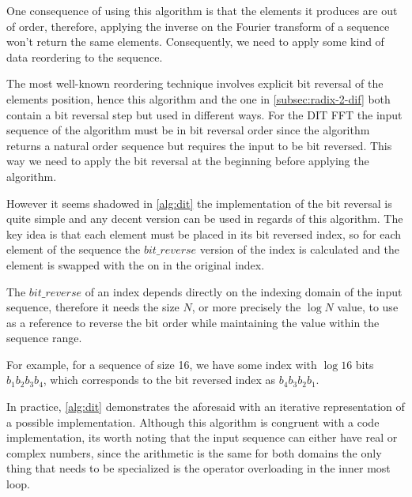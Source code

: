 \documentclass[
  oneside,
  11pt, a4paper,
  footinclude=true,
  headinclude=true,
  cleardoublepage=empty
]{scrbook}
\begin{document}
One consequence of using this algorithm is that the elements it produces are out of order, therefore, applying the inverse on the Fourier transform of a sequence won't return the same elements. Consequently, we need to apply some kind of data reordering to the sequence.

The most well-known reordering technique involves explicit bit reversal of the elements position, hence this algorithm and the one in \autoref{subsec:radix-2-dif} both contain a bit reversal step but used in different ways. For the DIT FFT  the input sequence of the algorithm must be in bit reversal order since the algorithm returns a natural order sequence but requires the input to be bit reversed. This way we need to apply the bit reversal at the beginning before applying the algorithm.

However it seems shadowed in \autoref{alg:dit} the implementation of the bit reversal is quite simple and any decent version can be used in regards of this algorithm. The key idea is that each element must be placed in its bit reversed index, so for each element of the sequence the $bit\_reverse$ version of the index is calculated and the element is swapped with the on in the original index.

The $bit\_reverse$ of an index depends directly on the indexing domain of the input sequence, therefore it needs the size $N$, or more precisely the $\log{N}$ value, to use as a reference to reverse the bit order while maintaining the value within the sequence range.

For example, for a sequence of size 16, we have some index with $\log{16}$ bits $b_1 b_2 b_3 b_4$, which corresponds to the bit reversed index as $b_4 b_3 b_2 b_1$.
\newline

In practice, \autoref{alg:dit} demonstrates the aforesaid with an iterative representation of a possible implementation. Although this algorithm is congruent with a code implementation, its worth noting that the input sequence can either have real or complex numbers, since the arithmetic is the same for both domains the only thing that needs to be specialized is the operator overloading in the inner most loop. \newline
\newline
\end{document}
